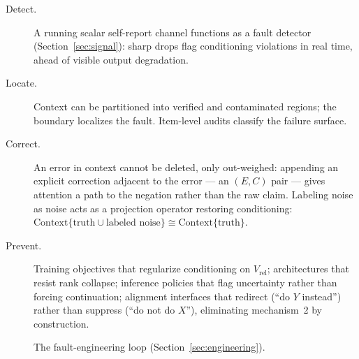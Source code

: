 \documentclass[11pt]{article}
\theoremstyle{remark}
\newcommand{\Vrel}{V_{\mathrm{rel}}}
\begin{document}
\begin{description}
\item[Detect.] A running scalar self-report channel functions as a fault detector
(Section~\ref{sec:signal}): sharp drops flag conditioning violations in real time,
ahead of visible output degradation.
\item[Locate.] Context can be partitioned into verified and contaminated regions; the
boundary localizes the fault. Item-level audits classify the failure surface.
\item[Correct.] An error in context cannot be deleted, only out-weighed: appending an
explicit correction adjacent to the error --- an $(E,C)$ pair --- gives attention a
path to the negation rather than the raw claim. Labeling noise as noise acts as a
projection operator restoring conditioning:
$\mathrm{Context}\{\text{truth} \cup \text{labeled noise}\} \cong
\mathrm{Context}\{\text{truth}\}$.
\item[Prevent.] Training objectives that regularize conditioning on $\Vrel$;
architectures that resist rank collapse; inference policies that flag uncertainty
rather than forcing continuation; alignment interfaces that redirect
(``do $Y$ instead'') rather than suppress (``do not do $X$''), eliminating
mechanism~2 by construction.
\end{description}


\begin{figure}[h]
\centering
{}
\caption{The fault-engineering loop (Section~\ref{sec:engineering}).}
\label{fig:loop}
\end{figure}
\end{document}
